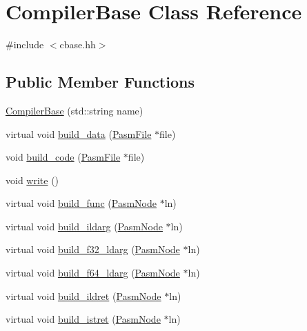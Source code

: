\hypertarget{classCompilerBase}{}\section{Compiler\+Base Class Reference}
\label{classCompilerBase}


{\ttfamily \#include $<$cbase.\+hh$>$}

\subsection*{Public Member Functions}
\begin{DoxyCompactItemize}
\item 
\hyperlink{classCompilerBase_aef84801d4117d64bc71a218de8f9ec41}{Compiler\+Base} (std\+::string name)
\item 
virtual void \hyperlink{classCompilerBase_a50e0a1c97a7b364e4a0051998c6c9f02}{build\+\_\+data} (\hyperlink{classPASM_1_1PasmFile}{Pasm\+File} $\ast$file)
\item 
void \hyperlink{classCompilerBase_a9a3e4e637e462ee907f8d472c5f3a582}{build\+\_\+code} (\hyperlink{classPASM_1_1PasmFile}{Pasm\+File} $\ast$file)
\item 
void \hyperlink{classCompilerBase_a064f1b7fae8680de3fa9bc5c2731c6c6}{write} ()
\item 
virtual void \hyperlink{classCompilerBase_a32f74fb5ba2d4c3385318d3362c589cc}{build\+\_\+func} (\hyperlink{classPASM_1_1PasmNode}{Pasm\+Node} $\ast$ln)
\item 
virtual void \hyperlink{classCompilerBase_adc22ab57615c0deeeeb53b3dcadda22a}{build\+\_\+ildarg} (\hyperlink{classPASM_1_1PasmNode}{Pasm\+Node} $\ast$ln)
\item 
virtual void \hyperlink{classCompilerBase_acb8c712aa20424ab1185173b523c58a5}{build\+\_\+f32\+\_\+ldarg} (\hyperlink{classPASM_1_1PasmNode}{Pasm\+Node} $\ast$ln)
\item 
virtual void \hyperlink{classCompilerBase_a734800d1c4364161c92fc4c3b36fe975}{build\+\_\+f64\+\_\+ldarg} (\hyperlink{classPASM_1_1PasmNode}{Pasm\+Node} $\ast$ln)
\item 
virtual void \hyperlink{classCompilerBase_a120c88795959157b98a0f896d153d6bc}{build\+\_\+ildret} (\hyperlink{classPASM_1_1PasmNode}{Pasm\+Node} $\ast$ln)
\item 
virtual void \hyperlink{classCompilerBase_a1f870adf4c420832ed821c9aa38352af}{build\+\_\+istret} (\hyperlink{classPASM_1_1PasmNode}{Pasm\+Node} $\ast$ln)
\item 

\end{DoxyCompactItemize}
